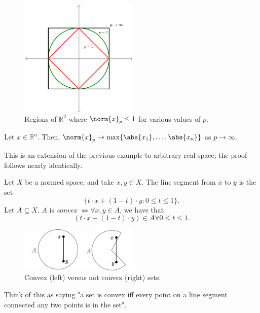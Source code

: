 \begin{figure}[!ht]
    \centering
    \includegraphics[width=0.5\textwidth]{misc/unitballs.png}
    \caption{Regions of $\mathbb{R}^2$ where $\norm{x}_p \leq 1$ for various values of $p$.}
\end{figure}
\begin{proposition}
    Let $x \in \mathbb{R}^n$. Then, $\norm{x}_p \to \max \{\abs{x_1}, \dots, \abs{x_n}\}$ as $p \to \infty$.
\end{proposition}

\begin{remark}
    This is an extension of the previous example to arbitrary real space; the proof follows nearly identically.
\end{remark}

\begin{definition}
    Let $X$ be a normed space, and take $x, y \in X$. The line segment from $x$ to $y$ is the set \[
    \{t \cdot x  + (1 - t)\cdot y: 0 \leq t \leq 1\} .
    \]
    Let $A \subseteq X$. $A$ is \emph{convex} $\iff \forall x,y \in A$, we have that $$(t \cdot x + (1- t)\cdot y) \in A \forall 0 \leq t \leq 1.$$
\end{definition}

\begin{figure}[!ht]
    \centering
    \includegraphics[width=0.5\textwidth]{misc/convex.png}
    \caption{Convex (left) versus not convex (right) sets.}
\end{figure}

\begin{remark}
    Think of this as saying "a set is convex iff every point on a line segment connected any two points is in the set".
\end{remark}

